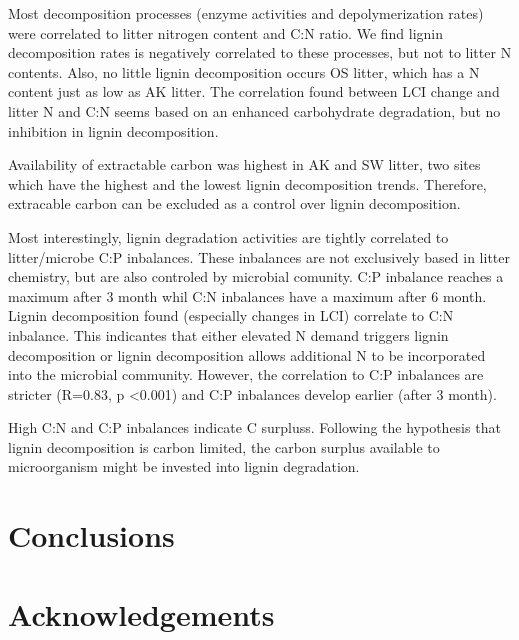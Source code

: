 \documentclass[authoryear,preprint,review,12pt]{elsarticle}
\begin{document}
Most decomposition processes (enzyme activities and depolymerization rates) were correlated to litter nitrogen content and C:N ratio. We find lignin decomposition rates is negatively correlated to these processes, but not to litter N contents. Also, no little lignin decomposition occurs OS litter, which has a N content just as low as AK litter. The correlation found between LCI change and litter N and C:N seems based on an enhanced carbohydrate degradation, but no inhibition in lignin decomposition.

Availability of extractable carbon was highest in AK and SW litter, two sites which have the highest and the lowest lignin decomposition trends. Therefore, extracable carbon can be excluded as a control over lignin decomposition.

Most interestingly, lignin degradation activities are tightly correlated to litter/microbe C:P inbalances. These inbalances are not exclusively based in litter chemistry, but are also controled by microbial comunity. C:P inbalance reaches a maximum after 3 month whil C:N inbalances have a maximum after 6 month. Lignin decomposition found (especially changes in LCI) correlate to C:N inbalance. This indicantes that either elevated N demand triggers lignin decomposition or lignin decomposition allows additional N to be incorporated into the microbial community. However, the correlation to C:P inbalances are stricter (R=0.83, p \textless 0.001) and C:P inbalances develop earlier (after 3 month).

High C:N and C:P inbalances indicate C surpluss. Following the hypothesis that lignin decomposition is carbon limited, the carbon surplus available to microorganism might be invested into lignin degradation.

\section{Conclusions}



\section{Acknowledgements}



\end{document}

